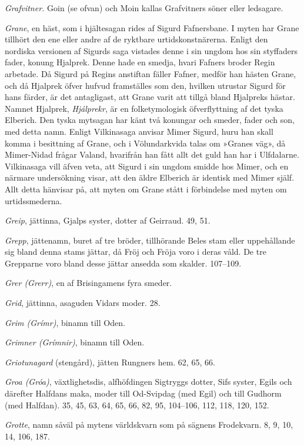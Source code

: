 \emph{Grafvitner.} Goin (se ofvan) och Moin kallas Grafvitners söner
eller ledsagare.

\emph{Grane}, en häst, som i hjältesagan rides af Sigurd Fafnersbane. I
myten har Grane tillhört den ene eller andre af de ryktbare
urtidskonstnärerna. Enligt den nordiska versionen af Sigurds saga
vistades denne i sin ungdom hos sin styffaders fader, konung Hjalprek.
Denne hade en smedja, hvari Fafners broder Regin arbetade. Då Sigurd på
Regins anstiftan fäller Fafner, medför han hästen Grane, och då Hjalprek
öfver hufvud framställes som den, hvilken utrustar Sigurd för hans
färder, är det antagligast, att Grane varit att tillgå bland Hjalpreks
hästar. Namnet Hjalprek, \emph{Hjálprekr}, är en folketymologisk
öfverflyttning af det tyska Elberich. Den tyska mytsagan har känt två
konungar och smeder, fader och son, med detta namn. Enligt Vilkinasaga
anvisar Mimer Sigurd, huru han skall komma i besittning af Grane, och i
Völundarkvida talas om »Granes väg», då Mimer-Nidad frågar Valand,
hvarifrån han fått allt det guld han har i Ulfdalarne. Vilkinasaga vill
äfven veta, att Sigurd i sin ungdom smidde hos Mimer, och en närmare
undersökning visar, att den äldre Elberich är identisk med Mimer själf.
Allt detta hänvisar på, att myten om Grane stått i förbindelse med myten
om urtidssmederna.

\emph{Greip}, jättinna, Gjalps syster, dotter af Geirraud. 49, 51.

\emph{Grepp}, jättenamn, buret af tre bröder, tillhörande Beles stam
eller uppehållande sig bland denna stams jättar, då Fröj och Fröja voro
i deras våld. De tre Grepparne voro bland desse jättar ansedda som
skalder. 107--109.

\emph{Grer (Grerr)}, en af Brisingamens fyra smeder.

\emph{Grid}, jättinna, asaguden Vidars moder. 28.

\emph{Grim (Grímr)}, binamn till Oden.

\emph{Grimner (Grímnir)}, binamn till Oden.

\emph{Griotunagard} (stengård), jätten Rungners hem. 62, 65, 66.

\emph{Groa (Gróa)}, växtlighetsdis, alfhöfdingen Sigtryggs dotter, Sifs
syster, Egils och därefter Halfdans maka, moder till Od-Svipdag (med
Egil) och till Gudhorm (med Halfdan). 35, 45, 63, 64, 65, 66, 82, 95,
104--106, 112, 118, 120, 152.

\emph{Grotte}, namn såväl på mytens världskvarn som på sägnens
Frodekvarn. 8, 9, 10, 14, 106, 187.

